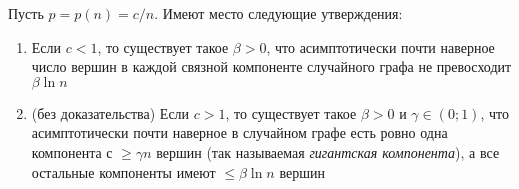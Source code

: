 \begin{theorem}
	Пусть $p = p(n) = c / n$. Имеют место следующие утверждения:
	\begin{enumerate}
		\item Если $c < 1$, то существует такое $\beta > 0$, что асимптотически почти наверное число вершин в каждой связной компоненте случайного графа не превосходит $\beta \ln n$
		
		\item (без доказательства) Если $c > 1$, то существует такое $\beta > 0$ и $\gamma \in (0; 1)$, что асимптотически почти наверное в случайном графе есть ровно одна компонента с $\ge \gamma n$ вершин (так называемая \textit{гигантская компонента}), а все остальные компоненты имеют $\le \beta \ln n$ вершин
	\end{enumerate}
\end{theorem}

